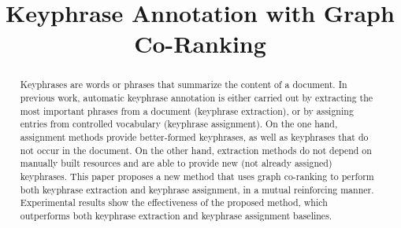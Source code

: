 \documentclass[11pt,a4paper]{article}
\title{Keyphrase Annotation with Graph Co-Ranking}
\author{
}
\date{}
\begin{document}
  \maketitle

  \begin{abstract}
  Keyphrases are words or phrases that summarize the content of a document.
  In previous work, automatic keyphrase annotation is either carried out 
  by extracting the most important phrases from a document (keyphrase 
  extraction), or by assigning entries from controlled vocabulary 
  (keyphrase assignment).
  On the one hand, assignment methods provide better-formed keyphrases, 
  as well as keyphrases that do not occur in the document.
  On the other hand, extraction methods do not depend on manually built 
  resources and are able to provide new (not already assigned) keyphrases.
%
  This paper proposes a new method that uses graph co-ranking to perform both
  keyphrase extraction and keyphrase assignment, in a mutual reinforcing manner.
  Experimental results show the effectiveness of the proposed method, which
  outperforms both keyphrase extraction and keyphrase assignment baselines.
%
  \end{abstract}

  
  
  
  
  
  


  
  
\end{document}
